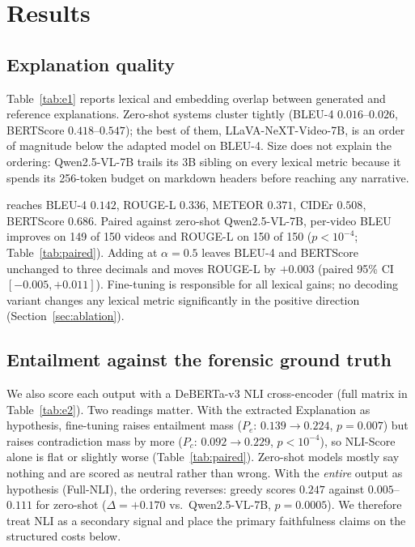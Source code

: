 \section{Results}
\label{sec:results}

\subsection{Explanation quality}
\label{sec:quality}

Table~\ref{tab:e1} reports lexical and embedding overlap between generated and reference explanations.
Zero-shot systems cluster tightly (BLEU-4 $0.016$--$0.026$, BERTScore $0.418$--$0.547$); the best of them, LLaVA-NeXT-Video-7B, is an order of magnitude below the adapted model on BLEU-4.
Size does not explain the ordering: Qwen2.5-VL-7B trails its 3B sibling on every lexical metric because it spends its 256-token budget on markdown headers before reaching any narrative.



\crashlogic{} reaches BLEU-4 $0.142$, ROUGE-L $0.336$, METEOR $0.371$, CIDEr $0.508$, BERTScore $0.686$.
Paired against zero-shot Qwen2.5-VL-7B, per-video BLEU improves on 149 of 150 videos and ROUGE-L on 150 of 150 ($p<10^{-4}$; Table~\ref{tab:paired}).
Adding \tcd{} at $\alpha{=}0.5$ leaves BLEU-4 and BERTScore unchanged to three decimals and moves ROUGE-L by $+0.003$ (paired 95\% CI $[-0.005,+0.011]$).
Fine-tuning is responsible for all lexical gains; no decoding variant changes any lexical metric significantly in the positive direction (Section~\ref{sec:ablation}).

\subsection{Entailment against the forensic ground truth}
\label{sec:faith}

We also score each output with a DeBERTa-v3 NLI cross-encoder (full matrix in Table~\ref{tab:e2}).
Two readings matter.
With the extracted Explanation as hypothesis, fine-tuning raises entailment mass ($P_e$: $0.139\to0.224$, $p{=}0.007$) but raises contradiction mass by more ($P_c$: $0.092\to0.229$, $p<10^{-4}$), so NLI-Score alone is flat or slightly worse (Table~\ref{tab:paired}).
Zero-shot models mostly say nothing and are scored as neutral rather than wrong.
With the \emph{entire} output as hypothesis (Full-NLI), the ordering reverses: \crashlogic{} greedy scores $0.247$ against $0.005$--$0.111$ for zero-shot ($\Delta{=}{+}0.170$ vs.\ Qwen2.5-VL-7B, $p{=}0.0005$).
We therefore treat NLI as a secondary signal and place the primary faithfulness claims on the structured costs below.

